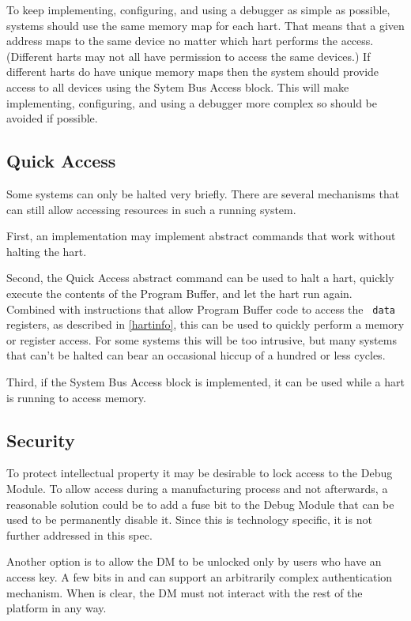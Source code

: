 \documentclass{article}
\begin{document}
To keep implementing, configuring, and using a debugger as simple as possible,
systems should use the same memory map for each hart. That means that a given
address maps to the same device no matter which hart performs the access.
(Different harts may not all have permission to access the same devices.) If
different harts do have unique memory maps then the system should provide
access to all devices using the Sytem Bus Access block.
This will make implementing,
configuring, and using a debugger more complex so should be avoided if
possible.

\subsection{Quick Access}

Some systems can only be halted very briefly. There are several mechanisms that
can still allow accessing resources in such a running system.

First, an implementation may implement abstract commands that work without
halting the hart.

Second, the Quick Access abstract command can be used to halt a hart, quickly
execute the contents of the Program Buffer, and let the hart run again.
Combined with instructions that allow Program Buffer code to access the {\tt
data} registers, as described in \ref{hartinfo}, this can be used to quickly
perform a memory or register access. For some systems this will be too
intrusive, but many systems that can't be halted can bear an occasional hiccup
of a hundred or less cycles.

Third, if the System Bus Access block is implemented, it can be used while a
hart is running to access memory.

\subsection{Security}

To protect intellectual property it may be desirable to lock access to the
Debug Module.  To allow access during a manufacturing process and not
afterwards, a reasonable solution could be to add a fuse bit to the Debug
Module that can be used to be permanently disable it. Since this is technology
specific, it is not further addressed in this spec.

Another option is to allow the DM to be unlocked only by users who have an
access key. A few bits in \Rdmcontrol and \Rauthdata can support an arbitrarily
complex authentication mechanism.  When \Fauthenticated is clear, the DM must
not interact with the rest of the platform in any way.
\end{document}
